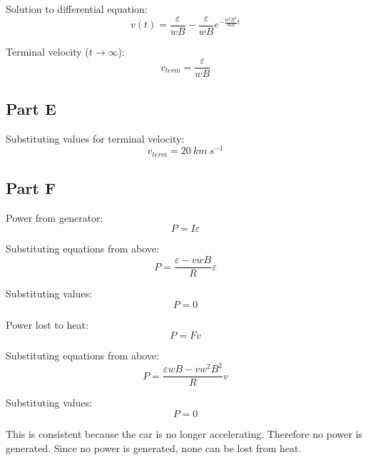 \documentclass{article}
\begin{document}
Solution to differential equation:
$$ v(t) = \frac{\varepsilon}{w B} - \frac{\varepsilon}{w B} e^{-\frac{w^2 B^2}{m
R} t} $$

Terminal velocity ($t \rightarrow \infty$):
$$ v_{term} = \frac{\varepsilon}{w B} $$

\subsection*{Part E}

Substituting values for terminal velocity:
$$ v_{term} = 20\ \si{km\ s^{-1}} $$

\subsection*{Part F}

Power from generator:
$$ P = I \varepsilon $$

Substituting equations from above:
$$ P = \frac{\varepsilon - v w B}{R} \varepsilon $$

Substituting values:
$$ P = 0 $$

Power lost to heat:
$$ P = F v $$

Substituting equations from above:
$$ P = \frac{\varepsilon w B - v w^2 B^2}{R} v $$

Substituting values:
$$ P = 0 $$

This is consistent because the car is no longer accelerating. Therefore no
power is generated. Since no power is generated, none can be lost from heat.
\end{document}
